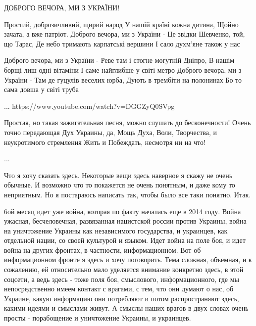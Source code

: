  
 
 
 
 

ДОБРОГО ВЕЧОРА, МИ З УКРАЇНИ!

Простий, доброзичливий, щирий народ
У нашій країні кожна дитина, 
Щойно зачата, а вже патріот. 
Доброго вечора, ми з України - 
Це звідки Шевченко, той, що Тарас,
Де небо тримають карпатські вершини
І сало духм'яне також у нас 

Доброго вечора, ми з України - 
Реве там і стогне могутній Дніпро,
В нашім борщі лиш одні вітаміни
І саме найглибше у світі метро
Доброго вечора, ми з України -
Там де гуцулів веселих юрба,
Дують в трембіти на полонинах
Бо то сама довша у світі труба

...
https://www.youtube.com/watch?v=DGGZyQ0SVpg

Простая, но такая зажигательная песня, можно слушать до бесконечности!  Очень
точно передающая Дух Украины, да, Мощь Духа, Воли, Творчества, и неукротимого
стремления Жить и Побеждать, несмотря ни на что!

...

Что я хочу сказать здесь. Некоторые вещи здесь наверное я скажу не очень
обычные.  И возможно что то покажется не очень понятным, и даже кому то
неприятным.  Но я постараюсь написать так, чтобы было все таки понятно. Итак. 

6ой месяц идет уже война, которая по факту началась еще в 2014 году. Война
ужасная, бесчеловечная, развязанная нацистской россии против Украины, война на
уничтожение Украины как независимого государства, и украинцев, как отдельной
нации, со своей культурой и языком.  Идет война на поле боя, и идет война на
других фронтах, в частности, информационном. Вот об информационном фронте я
здесь и хочу поговорить. Тема сложная, объемная, и к сожалению, ей относительно
мало уделяется внимание конкретно здесь, в этой соцсети, а ведь здесь - тоже
поля боя, смыслового, информационного, где мы непосредственно имеем контакт с
врагами, с тем, что они думают о нас, об Украине, какую информацию они
потребляют и потом распространяют здесь, какими идеями и смыслами живут. А
смыслы наших врагов в двух словах очень просты - порабощение и уничтожение
Украины, и украинцев. 

